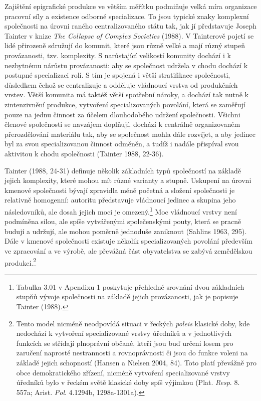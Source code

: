 Zajištění epigrafické produkce ve větším měřítku podmiňuje velká míra organizace pracovní síly a existence odborné specializace. To jsou typické znaky komplexní společnosti na úrovni raného centralizovaného státu tak, jak jí představuje Joseph Tainter v knize {\em The Collapse of Complex Societies} (1988). V Tainterově pojetí se lidé přirozeně sdružují do komunit, které jsou různě velké a mají různý stupeň provázanosti, tzv. komplexity. S narůstající velikostí komunity dochází i k nezbytnému nárůstu provázanosti: aby se společnost udržela v chodu dochází k postupné specializaci rolí. S tím je spojená i větší stratifikace společnosti, důsledkem čehož se centralizuje a odděluje vládnoucí vrstva od produkčních vrstev. Větší komunita má taktéž větší spotřební nároky, a dochází tak nutně k zintenzivnění produkce, vytvoření specializovaných povolání, která se zaměřují pouze na jednu činnost za účelem dlouhodobého udržení společnosti. Všichni členové společnosti se navzájem doplňují, dochází k centrálně organizovaném přerozdělování materiálu tak, aby se společnost mohla dále rozvíjet, a aby jedinec byl za svou specializovanou činnost odměněn, a tudíž i nadále přispíval svou aktivitou k chodu společnosti (Tainter 1988, 22-36).

Tainter (1988, 24-31) definuje několik základních typů společností na základě jejich komplexity, které mohou mít různé varianty a stupně. Uskupení na úrovni kmenové společnosti bývají zpravidla méně početná a složení společnosti je relativně homogenní: autoritu představuje vládnoucí jedinec a skupina jeho následovníků, ale dosah jejich moci je omezený.\footnote{Tabulka 3.01 v Apendixu 1 poskytuje přehledné srovnání dvou základních stupňů vývoje společnosti na základě jejich provázanosti, jak je popisuje Tainter (1988).} Moc vládnoucí vrstvy není podmíněna silou, ale spíše vytvářenými společenskými pouty, která se pracně budují a udržují, ale mohou poměrně jednoduše zaniknout (Sahlins 1963, 295). Dále v kmenové společnosti existuje několik specializovaných povolání především ve zpracování a ve výrobě, ale převážná část obyvatelstva se zabývá zemědělskou produkcí.\footnote{Tento model nicméně neodpovídá situaci v řeckých {\em poleis} klasické doby, kde nedochází k vytvoření specializované vrstvy úředníků a v jednotlivých funkcích se střídají plnoprávní občané, kteří jsou buď určeni losem pro zaručení naprosté nestrannosti a rovnoprávnosti či jsou do funkce voleni na základě jejich schopností (Hansen a Nielsen 2004, 84). Toto platí převážně pro obce demokratického zřízení, nicméně vytvoření specializované vrstvy úředníků bylo v řeckém světě klasické doby spíš výjimkou (Plat. {\em Resp}. 8. 557a; Arist. {\em Pol}. 4.1294b, 1298a-1301a).}

